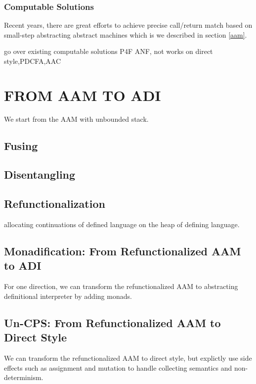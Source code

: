 \documentclass[acmsmall,review,anonymous]{acmart}\settopmatter{printfolios=true,printccs=false,printacmref=false}
\begin{document}
\subsubsection{Computable Solutions}

Recent years, there are great efforts \cite{vardoulakis2010cfa2,
  earl2012introspective, gilray2016pushdown}
to achieve precise call/return match based
on small-step abstracting abstract machines which is we described in section \ref{aam}.

go over existing computable solutions P4F ANF, not works on direct style,PDCFA,AAC

\section{FROM AAM TO ADI}

We start from the AAM with unbounded stack.

\subsection{Fusing}

\subsection{Disentangling}

\subsection{Refunctionalization}

allocating continuations of defined language on the heap of defining language.


\subsection{Monadification: From Refunctionalized AAM to ADI}

For one direction, we can transform the refunctionalized AAM to abstracting definitional interpreter
by adding monads.

\subsection{Un-CPS: From Refunctionalized AAM to Direct Style}

We can transform the refunctionalized AAM to direct style, but explictly use 
side effects such as assignment and mutation to handle collecting semantics and non-determinism.
\end{document}
